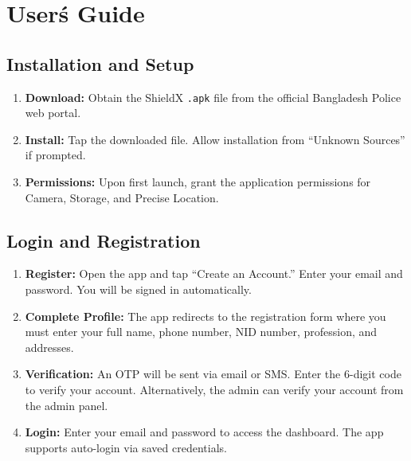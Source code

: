 \documentclass[12pt, a4paper, twoside]{report}
\begin{document}
\chapter{User\'s Guide}
\section*{Installation and Setup}
\begin{enumerate}
    \item \textbf{Download:} Obtain the ShieldX \texttt{.apk} file from the official Bangladesh Police web portal.
    \item \textbf{Install:} Tap the downloaded file. Allow installation from ``Unknown Sources'' if prompted.
    \item \textbf{Permissions:} Upon first launch, grant the application permissions for Camera, Storage, and Precise Location.
\end{enumerate}
\section*{Login and Registration}
\begin{enumerate}
    \item \textbf{Register:} Open the app and tap ``Create an Account.'' Enter your email and password. You will be signed in automatically.
    \item \textbf{Complete Profile:} The app redirects to the registration form where you must enter your full name, phone number, NID number, profession, and addresses.
    \item \textbf{Verification:} An OTP will be sent via email or SMS. Enter the 6-digit code to verify your account. Alternatively, the admin can verify your account from the admin panel.
    \item \textbf{Login:} Enter your email and password to access the dashboard. The app supports auto-login via saved credentials.
\end{enumerate}
\end{document}
